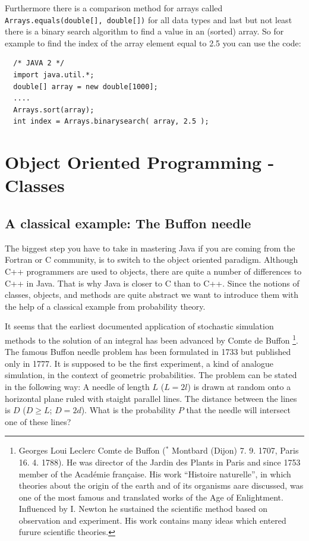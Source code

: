 Furthermore there is a comparison method for arrays called
\verb|Arrays.equals(double[], double[])| for all data types and
last but not least there is a binary search algorithm to
find a value in an (sorted) array. So for example to find the index of the
array element equal to 2.5 you can use the code:
\begin{verbatim}
  /* JAVA 2 */
  import java.util.*;
  double[] array = new double[1000];
  ....
  Arrays.sort(array);
  int index = Arrays.binarysearch( array, 2.5 );
\end{verbatim}


\section{Object Oriented Programming - Classes}
\label{sec:objectoriented}
\subsection{A classical example: The Buffon needle}
The biggest step you have to take in mastering Java if you are
coming from the Fortran or C community, is to switch to the object
oriented paradigm. Although C++ programmers are used to objects, there
are quite a number of differences to C++ in Java. That is why Java
is closer to C than to C++. Since the notions of classes, objects, and
methods are quite abstract we want to introduce them with the help of
a classical example from probability theory. 

It seems that the earliest documented application of stochastic simulation
methods to the solution of an integral has been advanced by Comte de
Buffon \footnote{Georges Loui Leclerc Comte de Buffon ($^*$ Montbard
  (Dijon) 7. 9. 1707, \dag Paris 16. 4. 1788). He was director of the
  Jardin des Plants in Paris and since 1753 member of the Acad\'emie 
fran\c{c}aise. His  work ``Histoire naturelle'', in which theories
about the origin of the earth and of  its organisms aare discussed,
was one of the most famous and translated works of the Age of
Enlightment. Influenced by I. Newton he sustained the scientific
method based on observation and experiment. His work contains many
ideas which entered furure scientific theories.}. The famous Buffon
needle problem has been formulated in 1733 but published only in 1777. It is
supposed
to be the first experiment, a kind of analogue simulation, in the
context of geometric probabilities. The problem can be stated in the
following way: A needle of length $L$ ($L=2l$) is drawn at random onto a
horizontal plane ruled with staight parallel lines. The distance
between the lines is $D$ ($D \ge L$; $D=2d$). 
What is the probability $P$ that the
needle will intersect one of these lines?

